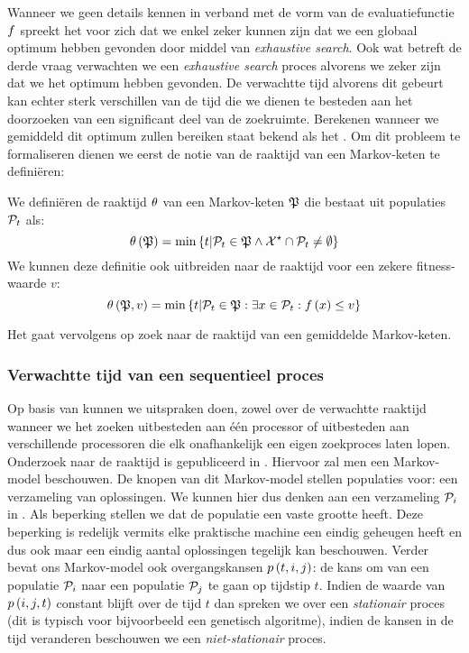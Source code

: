 Wanneer we geen details kennen in verband met de vorm van de evaluatiefunctie $f$ spreekt het voor zich dat we enkel zeker kunnen zijn dat we een globaal optimum hebben gevonden door middel van \emph{exhaustive search}. Ook wat betreft de derde vraag verwachten we een \emph{exhaustive search} proces alvorens we zeker zijn dat we het optimum hebben gevonden. De verwachtte tijd alvorens dit gebeurt kan echter sterk verschillen van de tijd die we dienen te besteden aan het doorzoeken van een significant deel van de zoekruimte. Berekenen wanneer we gemiddeld dit optimum zullen bereiken staat bekend als het . Om dit probleem te formaliseren dienen we eerst de notie van de raaktijd van een Markov-keten te defini\"eren:

\begin{definition}
We defini\"eren de raaktijd $\theta$ van een Markov-keten $\mathfrak{P}$ die bestaat uit populaties $\mathcal{P}_t$ als:
\begin{equation}
\theta\left(\mathfrak{P}\right)=\min\left\{ t|\mathcal{P}_t\in\mathfrak{P}\wedge\mathcal{X}^{\star}\cap \mathcal{P}_t\neq\emptyset\right\}
\end{equation}
We kunnen deze definitie ook uitbreiden naar de raaktijd voor een zekere fitness-waarde $v$:
\begin{equation}
\theta\left(\mathfrak{P},v\right)=\min\left\{ t|\mathcal{P}_t\in\mathfrak{P}:\exists x\in \mathcal{P}_t:f\left(x\right)\leq v\right\}
\end{equation}
\end{definition}

Het  gaat vervolgens op zoek naar de raaktijd van een gemiddelde Markov-keten.

\subsubsection{Verwachtte tijd van een sequentieel proces}

Op basis van  kunnen we uitspraken doen, zowel over de verwachtte raaktijd wanneer we het zoeken uitbesteden aan \'e\'en processor of uitbesteden aan verschillende processoren die elk onafhankelijk een eigen zoekproces laten lopen. Onderzoek naar de raaktijd is gepubliceerd in \cite{DBLP:journals/jc/ShonkwilerV94}. Hiervoor zal men een Markov-model beschouwen. De knopen van dit Markov-model stellen populaties voor: een verzameling van oplossingen. We kunnen hier dus denken aan een verzameling $\mathcal{P}_i$ in . Als beperking stellen we dat de populatie een vaste grootte heeft. Deze beperking is redelijk vermits elke praktische machine een eindig geheugen heeft en dus ook maar een eindig aantal oplossingen tegelijk kan beschouwen. Verder bevat ons Markov-model ook overgangskansen $p\left(t,i,j\right)$: de kans om van een populatie $\mathcal{P}_i$ naar een populatie $\mathcal{P}_j$ te gaan op tijdstip $t$. Indien de waarde van $p\left(i,j,t\right)$ constant blijft over de tijd $t$ dan spreken we over een \emph{stationair} proces (dit is typisch voor bijvoorbeeld een genetisch algoritme), indien de kansen in de tijd veranderen beschouwen we een \emph{niet-stationair} proces.

